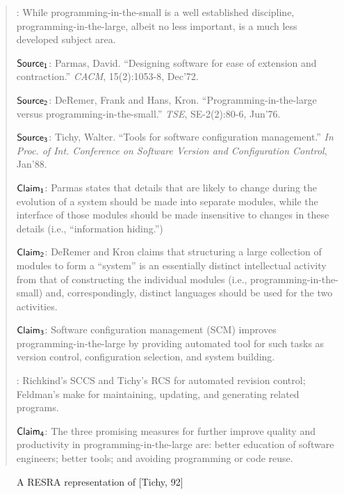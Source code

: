 \small
\begin{quotation}
  : While programming-in-the-small is a well
  established discipline, programming-in-the-large, albeit no less
  important, is a much less developed subject area.
  
  \noindent \( {\sf Source_{1}} \): Parmas, David. ``Designing software for
  ease of extension and contraction.'' {\it CACM\/}, 15(2):1053-8, Dec'72.

  \noindent \( {\sf Source_{2}} \): DeRemer, Frank and Hans, Kron.
  ``Programming-in-the-large versus programming-in-the-small.'' {\it
  TSE\/}, SE-2(2):80-6, Jun'76.
  
  \noindent \( {\sf Source_{3}} \): Tichy, Walter. ``Tools for software
  configuration management.'' {\it In Proc. of Int. Conference on Software
  Version and Configuration Control\/}, Jan'88.
  
  \noindent\( {\sf Claim_{1}\/} \): Parmas states that details that are
  likely to change during the evolution of a system should be made into
  separate modules, while the interface of those modules should be made
  insensitive to changes in these details (i.e., ``information hiding.'')
  
  \noindent\( {\sf Claim_{2}} \): DeRemer and Kron claims that
  structuring a large collection of modules to form a ``system'' is an
  essentially distinct intellectual activity from that of constructing
  the individual modules (i.e., programming-in-the-small) and,
  correspondingly, distinct languages should be used for the two
  activities.
  
  \noindent\( {\sf Claim_{3}} \): Software configuration management (SCM)
  improves programming-in-the-large by providing automated tool for such
  tasks as version control, configuration selection, and system building.
  
  : Richkind's {\sf SCCS\/} and Tichy's {\sf
  RCS\/} for automated revision control; Feldman's {\sf make\/} for
  maintaining, updating, and generating related programs.
  
  \noindent\( {\sf Claim_{4}} \): The three promising measures for
  further improve quality and productivity in programming-in-the-large
  are: better education of software engineers; better tools; and avoiding
  programming or code reuse.
\end{quotation}
\normalsize

\begin{figure}[htb]
  \caption{A RESRA representation of [Tichy, 92]}
  \label{fig:tichy}
\end{figure}


